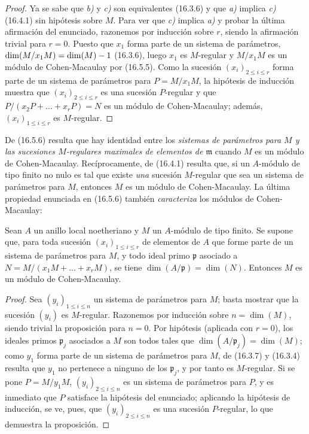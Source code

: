 \begin{proof}
Ya se sabe que \emph{b)} y \emph{c)} son equivalentes (16.3.6) y que \emph{a)} implica \emph{c)}
(16.4.1) sin hipótesis sobre $M$. Para ver que \emph{c)} implica \emph{a)} y probar la
última afirmación del enunciado, razonemos por inducción sobre $r$, siendo la
afirmación trivial para $r=0$. Puesto que $x_1$ forma parte de un sistema de
parámetros, $\dim(M/x_1M)=\dim(M)- 1$ (16.3.6), luego $x_1$ es $M$-regular y
$M/x_1M$ es un módulo de Cohen-Macaulay por (16.5.5). Como la sucesión
$(x_i)_{2\leq i\leq r}$ forma parte de un sistema de parámetros para
$P=M/x_1M$, la hipótesis de inducción muestra que $(x_i)_{2\leq i\leq r}$ es
una sucesión $P$-regular y que
$P/(x_2P+\ldots+x_rP)=N$ es un módulo de Cohen-Macaulay; además,
$(x_i)_{1\leq i\leq r}$ es $M$-regular.
\end{proof}

\begin{remark}[16.5.7]
\label{0.16.5.7-fr}
De (16.5.6) resulta que hay identidad entre los \emph{sistemas de
parámetros para $M$ y las sucesiones $M$-regulares maximales de elementos de
$\mathfrak{m}$} cuando $M$ es un módulo de Cohen-Macaulay. Recíprocamente, de
(16.4.1) resulta que, si un $A$-módulo de tipo finito no nulo es tal que existe
\emph{una} sucesión $M$-regular que sea un sistema de parámetros para $M$, entonces
$M$ es un módulo de Cohen-Macaulay. La última propiedad enunciada en
(16.5.6) también \emph{caracteriza} los módulos de Cohen-Macaulay:
\end{remark}

\begin{proposition}[16.5.8]
\label{0.16.5.8-fr}
Sean $A$ un anillo local noetheriano y $M$ un $A$-módulo de tipo finito. Se
supone que, para toda sucesión $(x_i)_{1\leq i\leq r}$ de elementos de $A$
que forme parte de un sistema de parámetros para $M$, y todo ideal primo
$\mathfrak{p}$ asociado a
$N=M/(x_1M+\ldots+x_rM)$, se tiene
$\dim(A/\mathfrak{p})=\dim(N)$. Entonces $M$ es un módulo de Cohen-Macaulay.
\end{proposition}

\begin{proof}
Sea $(y_i)_{1\leq i\leq n}$ un sistema de parámetros para $M$; basta
mostrar que la sucesión $(y_i)$ es $M$-regular. Razonemos por inducción sobre
$n=\dim(M)$, siendo trivial la proposición para $n=0$. Por hipótesis
(aplicada con $r=0$), los ideales primos $\mathfrak{p}_j$ asociados a $M$
son todos tales que $\dim(A/\mathfrak{p}_j)=\dim(M)$; como $y_1$ forma parte
de un sistema de parámetros
para $M$, de (16.3.7) y (16.3.4) resulta que $y_1$ no pertenece a ninguno
de los $\mathfrak{p}_j$, y por tanto es $M$-regular. Si se pone $P=M/y_1M$,
$(y_i)_{2\leq i\leq n}$ es un sistema de parámetros para $P$, y es
inmediato que $P$ satisface la hipótesis del enunciado; aplicando la hipótesis
de inducción, se ve, pues, que $(y_i)_{2\leq i\leq n}$ es una sucesión
$P$-regular, lo que demuestra la proposición.
\end{proof}

